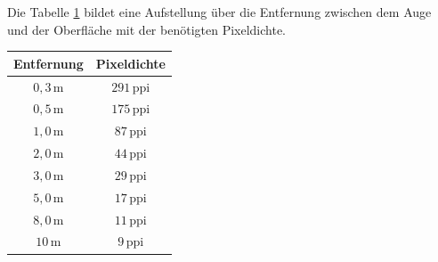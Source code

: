 Die Tabelle \ref{tab:Aufloessung} bildet eine Aufstellung über die Entfernung zwischen dem Auge und der Oberfläche mit der benötigten Pixeldichte.
\begin{table}[hbt]	
	\centering
	\renewcommand{\arraystretch}{1.5}	%
	\label{tab:Aufloessung}
	\begin{tabular}{c|c}
		\parbox[t]{0.2\linewidth}{\centering Entfernung} & \parbox[t]{0.2\linewidth}{\centering Pixeldichte}  \\
		\hline 
		\hline 
		$ 0,3\,\mathrm{m} $ & $ 291\,\mathrm{ppi} $ \\
		$ 0,5\,\mathrm{m} $ & $ 175\,\mathrm{ppi} $ \\
		$ 1,0\,\mathrm{m} $ & $ 87\,\mathrm{ppi} $ \\
		$ 2,0\,\mathrm{m} $ & $ 44\,\mathrm{ppi} $ \\
		$ 3,0\,\mathrm{m} $ & $ 29\,\mathrm{ppi} $ \\
		$ 5,0\,\mathrm{m} $ & $ 17\,\mathrm{ppi} $ \\
		$ 8,0\,\mathrm{m} $ & $ 11\,\mathrm{ppi} $ \\
		$ 10\,\mathrm{m} $ & $ 9\,\mathrm{ppi} $ \\
	\end{tabular} 
\end{table}
